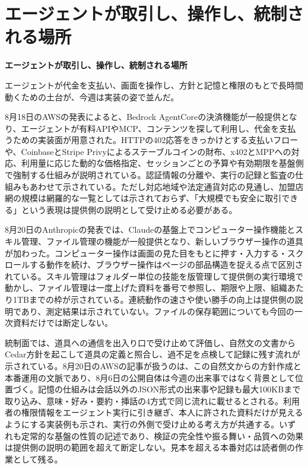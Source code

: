 \section{エージェントが取引し、操作し、統制される場所}
\begin{wideflow}
{\Large\bfseries エージェントが取引し、操作し、統制される場所}\par
\smallskip
{\color{SurveyMuted}エージェントが代金を支払い、画面を操作し、方針と記憶と権限のもとで長時間動くための土台が、今週は実装の姿で並んだ。}\par
\end{wideflow}

\noindent 8月18日のAWSの発表によると、Bedrock AgentCoreの決済機能が一般提供となり、エージェントが有料APIやMCP、コンテンツを探して利用し、代金を支払うための実装面が用意された。HTTPの402応答をきっかけとする支払いフローや、CoinbaseとStripe Privyによるステーブルコインの財布、x402とMPPへの対応、利用量に応じた動的な価格指定、セッションごとの予算や有効期限を基盤側で強制する仕組みが説明されている。認証情報の分離や、実行の記録と監査の仕組みもあわせて示されている。ただし対応地域や法定通貨対応の見通し、加盟店網の規模は網羅的な一覧としては示されておらず、「大規模でも安全に取引できる」という表現は提供側の説明として受け止める必要がある。 \cite{w2026w34w34eventc010}\par\medskip

\noindent 8月20日のAnthropicの発表では、Claudeの基盤上でコンピューター操作機能とスキル管理、ファイル管理の機能が一般提供となり、新しいブラウザー操作の道具が加わった。コンピューター操作は画面の見た目をもとに押す・入力する・スクロールする動作を続け、ブラウザー操作はページの部品構造を捉える点で区別されている。スキル管理はフォルダー単位の技能を版管理して提供側の実行環境で動かし、ファイル管理は一度上げた資料を番号で参照し、期限や上限、組織あたり1TBまでの枠が示されている。連続動作の速さや使い勝手の向上は提供側の説明であり、測定結果は示されていない。ファイルの保存範囲についても今回の一次資料だけでは断定しない。 \cite{w2026w34w34eventc011}\par\medskip

\noindent 統制面では、道具への通信を出入り口で受け止めて評価し、自然文の文書からCedar方針を起こして道具の定義と照合し、過不足を点検して記録に残す流れが示されている。8月20日のAWSの記事が扱うのは、この自然文からの方針作成と本番運用の文脈であり、8月6日の公開自体は今週の出来事ではなく背景として位置づく。記憶の仕組みは会話以外のJSON形式の出来事や記録も最大100KBまで取り込み、意味・好み・要約・挿話の4方式で同じ流れに載せるとされる。利用者の権限情報をエージェント実行に引き継ぎ、本人に許された資料だけが見えるようにする実装例も示され、実行の外側で受け止める考え方が共通する。いずれも定常的な基盤の性質の記述であり、検証の完全性や振る舞い・品質への効果は提供側の説明の範囲を超えて断定しない。見本を超える本番対応は読者側の作業として残る。 \cite{w2026w34w34eventc087,w2026w34w34eventc031,w2026w34w34eventgapawsagentcorememoryjson,w2026w34w34eventc104}\par\medskip

